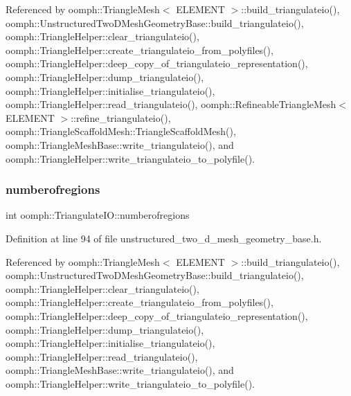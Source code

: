 Referenced by oomph\+::\+Triangle\+Mesh$<$ E\+L\+E\+M\+E\+N\+T $>$\+::build\+\_\+triangulateio(), oomph\+::\+Unstructured\+Two\+D\+Mesh\+Geometry\+Base\+::build\+\_\+triangulateio(), oomph\+::\+Triangle\+Helper\+::clear\+\_\+triangulateio(), oomph\+::\+Triangle\+Helper\+::create\+\_\+triangulateio\+\_\+from\+\_\+polyfiles(), oomph\+::\+Triangle\+Helper\+::deep\+\_\+copy\+\_\+of\+\_\+triangulateio\+\_\+representation(), oomph\+::\+Triangle\+Helper\+::dump\+\_\+triangulateio(), oomph\+::\+Triangle\+Helper\+::initialise\+\_\+triangulateio(), oomph\+::\+Triangle\+Helper\+::read\+\_\+triangulateio(), oomph\+::\+Refineable\+Triangle\+Mesh$<$ E\+L\+E\+M\+E\+N\+T $>$\+::refine\+\_\+triangulateio(), oomph\+::\+Triangle\+Scaffold\+Mesh\+::\+Triangle\+Scaffold\+Mesh(), oomph\+::\+Triangle\+Mesh\+Base\+::write\+\_\+triangulateio(), and oomph\+::\+Triangle\+Helper\+::write\+\_\+triangulateio\+\_\+to\+\_\+polyfile().

\mbox{\label{structoomph_1_1TriangulateIO_a90d13cdb572f5d3cd51946cd10210b17}} 
\subsubsection{\texorpdfstring{numberofregions}{numberofregions}}
{\footnotesize\ttfamily int oomph\+::\+Triangulate\+I\+O\+::numberofregions}



Definition at line 94 of file unstructured\+\_\+two\+\_\+d\+\_\+mesh\+\_\+geometry\+\_\+base.\+h.



Referenced by oomph\+::\+Triangle\+Mesh$<$ E\+L\+E\+M\+E\+N\+T $>$\+::build\+\_\+triangulateio(), oomph\+::\+Unstructured\+Two\+D\+Mesh\+Geometry\+Base\+::build\+\_\+triangulateio(), oomph\+::\+Triangle\+Helper\+::clear\+\_\+triangulateio(), oomph\+::\+Triangle\+Helper\+::create\+\_\+triangulateio\+\_\+from\+\_\+polyfiles(), oomph\+::\+Triangle\+Helper\+::deep\+\_\+copy\+\_\+of\+\_\+triangulateio\+\_\+representation(), oomph\+::\+Triangle\+Helper\+::dump\+\_\+triangulateio(), oomph\+::\+Triangle\+Helper\+::initialise\+\_\+triangulateio(), oomph\+::\+Triangle\+Helper\+::read\+\_\+triangulateio(), oomph\+::\+Triangle\+Mesh\+Base\+::write\+\_\+triangulateio(), and oomph\+::\+Triangle\+Helper\+::write\+\_\+triangulateio\+\_\+to\+\_\+polyfile().

